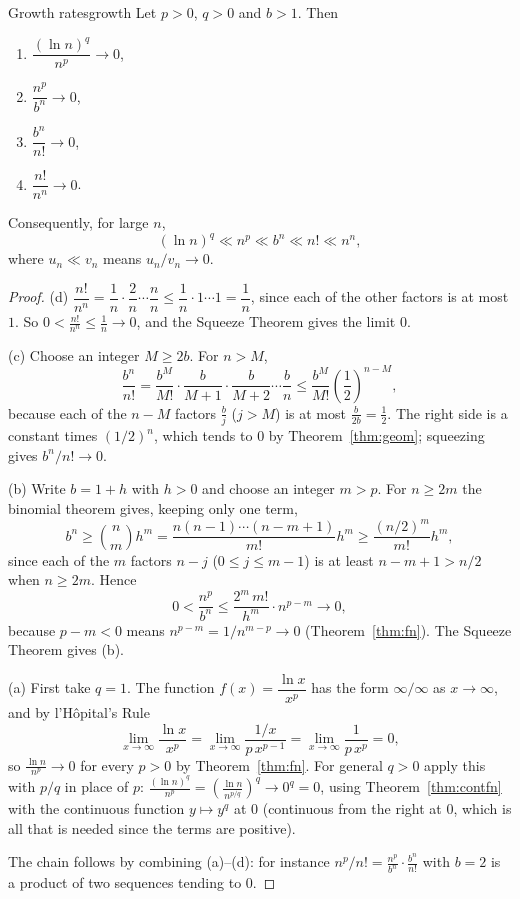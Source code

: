\documentclass[11pt]{article}
\begin{document}
\begin{thm}{Growth rates}{growth}
Let $p>0$, $q>0$ and $b>1$. Then
\begin{enumerate}[label=(\alph*)]
  \item $\dfrac{(\ln n)^q}{n^p}\to0$,
  \item $\dfrac{n^p}{b^n}\to0$,
  \item $\dfrac{b^n}{n!}\to0$,
  \item $\dfrac{n!}{n^n}\to0$.
\end{enumerate}
Consequently, for large $n$,
\[
(\ln n)^q\ll n^p\ll b^n\ll n!\ll n^n,
\]
where $u_n\ll v_n$ means $u_n/v_n\to0$.
\end{thm}
\begin{proof}
(d) $\dfrac{n!}{n^n}=\dfrac1n\cdot\dfrac2n\cdots\dfrac nn\le\dfrac1n\cdot1\cdots1=\dfrac1n$, since each of the other factors is at most $1$. So $0<\frac{n!}{n^n}\le\frac1n\to0$, and the Squeeze Theorem gives the limit $0$.

(c) Choose an integer $M\ge2b$. For $n>M$,
\[
\frac{b^n}{n!}=\frac{b^M}{M!}\cdot\frac{b}{M+1}\cdot\frac{b}{M+2}\cdots\frac bn\le\frac{b^M}{M!}\left(\frac12\right)^{n-M},
\]
because each of the $n-M$ factors $\frac bj$ ($j>M$) is at most $\frac b{2b}=\frac12$. The right side is a constant times $(1/2)^n$, which tends to $0$ by Theorem~\ref{thm:geom}; squeezing gives $b^n/n!\to0$.

(b) Write $b=1+h$ with $h>0$ and choose an integer $m>p$. For $n\ge2m$ the binomial theorem gives, keeping only one term,
\[
b^n\ge\binom nm h^m=\frac{n(n-1)\cdots(n-m+1)}{m!}h^m\ge\frac{(n/2)^m}{m!}h^m ,
\]
since each of the $m$ factors $n-j$ ($0\le j\le m-1$) is at least $n-m+1>n/2$ when $n\ge2m$. Hence
\[
0<\frac{n^p}{b^n}\le\frac{2^m\,m!}{h^m}\cdot n^{p-m}\to0,
\]
because $p-m<0$ means $n^{p-m}=1/n^{m-p}\to0$ (Theorem~\ref{thm:fn}). The Squeeze Theorem gives (b).

(a) First take $q=1$. The function $f(x)=\dfrac{\ln x}{x^p}$ has the form $\infty/\infty$ as $x\to\infty$, and by l'H\^opital's Rule
\[
\lim_{x\to\infty}\frac{\ln x}{x^p}=\lim_{x\to\infty}\frac{1/x}{p\,x^{p-1}}=\lim_{x\to\infty}\frac1{p\,x^{p}}=0,
\]
so $\frac{\ln n}{n^p}\to0$ for every $p>0$ by Theorem~\ref{thm:fn}. For general $q>0$ apply this with $p/q$ in place of $p$: $\frac{(\ln n)^q}{n^p}=\left(\frac{\ln n}{n^{p/q}}\right)^q\to0^q=0$, using Theorem~\ref{thm:contfn} with the continuous function $y\mapsto y^q$ at $0$ (continuous from the right at $0$, which is all that is needed since the terms are positive).

The chain follows by combining (a)--(d): for instance $n^p/n!=\frac{n^p}{b^n}\cdot\frac{b^n}{n!}$ with $b=2$ is a product of two sequences tending to $0$.
\end{proof}
\end{document}
